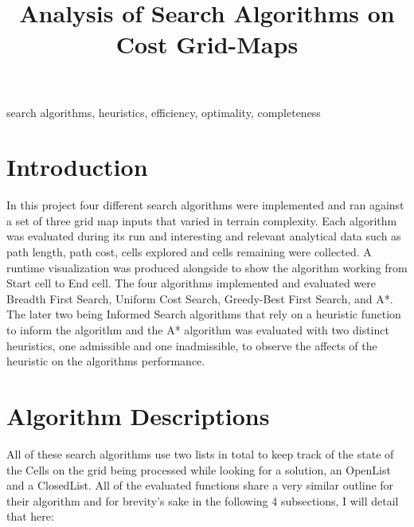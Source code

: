 \documentclass[conference]{IEEEtran}
\begin{document}
\title{Analysis of Search Algorithms on Cost Grid-Maps}

\author{
}

\maketitle


\begin{IEEEkeywords}
search algorithms, heuristics, efficiency, optimality, completeness
\end{IEEEkeywords}


\section{Introduction}

In this project four different search algorithms were implemented and ran against a set of three grid map inputs that varied in terrain complexity. Each algorithm was evaluated during its run and interesting and relevant analytical data such as path length, path cost, cells explored and cells remaining were collected. A runtime visualization was produced alongside to show the algorithm working from Start cell to End cell. The four algorithms implemented and evaluated were Breadth First Search, Uniform Cost Search, Greedy-Best First Search, and A*. The later two being Informed Search algorithms that rely on a heuristic function to inform the algorithm and the A* algorithm was evaluated with two distinct heuristics, one admissible and one inadmissible, to observe the affects of the heuristic on the algorithms performance.


\section{Algorithm Descriptions}
All of these search algorithms use two lists in total to keep track of the state of the Cells on the grid being processed while looking for a solution, an OpenList and a ClosedList. All of the evaluated functions share a very similar outline for their algorithm and for brevity's sake in the following 4 subsections, I will detail that here:
\end{document}
